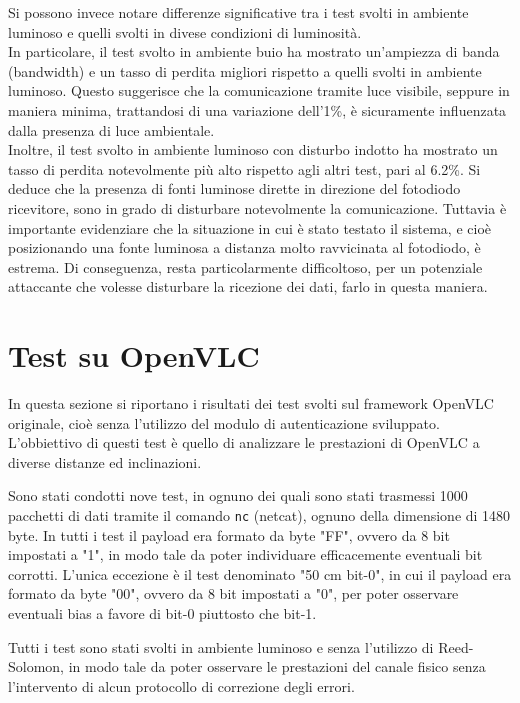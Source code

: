 Si possono invece notare differenze significative tra i test svolti in ambiente luminoso e quelli svolti in divese condizioni di luminosità.\\
In particolare, il test svolto in ambiente buio ha mostrato un'ampiezza di banda (bandwidth) e un tasso di perdita migliori rispetto a quelli svolti in ambiente luminoso. Questo suggerisce che la comunicazione tramite luce visibile, seppure in maniera minima, trattandosi di una variazione dell'1\%, è sicuramente influenzata dalla presenza di luce ambientale.\\
Inoltre, il test svolto in ambiente luminoso con disturbo indotto ha mostrato un tasso di perdita notevolmente più alto rispetto agli altri test, pari al 6.2\%. Si deduce che la presenza di fonti luminose dirette in direzione del fotodiodo ricevitore, sono in grado di disturbare notevolmente la comunicazione. Tuttavia è importante evidenziare che la situazione in cui è stato testato il sistema, e cioè posizionando una fonte luminosa a distanza molto ravvicinata al fotodiodo, è estrema. Di conseguenza, resta particolarmente difficoltoso, per un potenziale attaccante che volesse disturbare la ricezione dei dati, farlo in questa maniera.

\section{Test su OpenVLC}
In questa sezione si riportano i risultati dei test svolti sul framework OpenVLC originale, cioè senza l'utilizzo del modulo di autenticazione sviluppato. L'obbiettivo di questi test è quello di analizzare le prestazioni di OpenVLC a diverse distanze ed inclinazioni.

Sono stati condotti nove test, in ognuno dei quali sono stati trasmessi 1000 pacchetti di dati tramite il comando \texttt{nc} (netcat), ognuno della dimensione di 1480 byte. In tutti i test il payload era formato da byte "FF", ovvero da 8 bit impostati a "1", in modo tale da poter individuare efficacemente eventuali bit corrotti. L'unica eccezione è il test denominato "50 cm bit-0", in cui il payload era formato da byte "00", ovvero da 8 bit impostati a "0", per poter osservare eventuali bias a favore di bit-0 piuttosto che bit-1.

Tutti i test sono stati svolti in ambiente luminoso e senza l'utilizzo di Reed-Solomon, in modo tale da poter osservare le prestazioni del canale fisico senza l'intervento di alcun protocollo di correzione degli errori.

